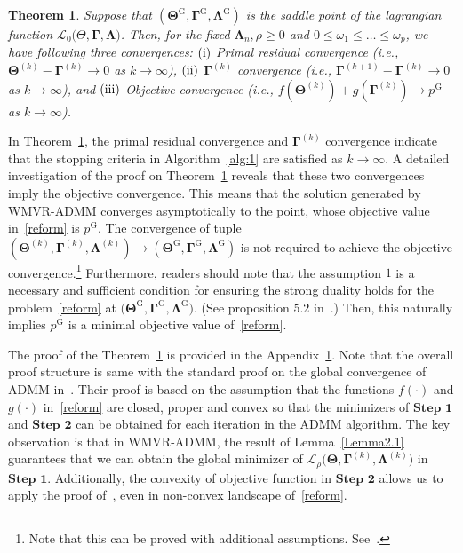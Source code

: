 \documentclass[12pt]{article}
\newcommand{\RN}[1]{%
  \textup{\uppercase\expandafter{\romannumeral#1}}%
}
\newtheorem{theorem}{Theorem}[section]
\begin{document}
\begin{theorem} \label{Thm1}
    Suppose that $(\boldsymbol{\Theta}^{\text{G}},\boldsymbol{\Gamma}^{\text{G}},\boldsymbol{\Lambda}^{\text{G}})$ is the saddle point of the lagrangian function $\mathcal{L}_{0} \big( \Theta,\boldsymbol{\Gamma},\boldsymbol{\Lambda} \big)$.
    Then, for the fixed $\boldsymbol{\Lambda}_{n}, \rho \geq 0 $ and $0\leq \omega_{1} \leq \dots \leq \omega_{p}$, 
    we have following three convergences: 
    $(\RN{1})$ Primal residual convergence (i.e., $\boldsymbol{\Theta}^{(k)}-\boldsymbol{\Gamma}^{(k)}\rightarrow{0}$ as $k\rightarrow{\infty}$), 
    $(\RN{2})$ $\boldsymbol{\Gamma}^{(k)}$ convergence (i.e., $\boldsymbol{\Gamma}^{(k+1)}-\boldsymbol{\Gamma}^{(k)}\rightarrow{0}$ as $k\rightarrow{\infty}$), and
    $(\RN{3})$ Objective convergence (i.e.,  $f(\boldsymbol{\Theta}^{(k)})+g(\boldsymbol{\Gamma}^{(k)})\rightarrow{p^{\text{G}}}$ as $k\rightarrow{\infty}$).
\end{theorem}

In Theorem~\ref{Thm1}, the primal residual convergence and $\boldsymbol{\Gamma}^{(k)}$ convergence indicate that the stopping criteria in Algorithm~\ref{alg:1} are satisfied as $k\rightarrow{\infty}$.
A detailed investigation of the proof on Theorem~\ref{Thm1} reveals that these two convergences imply the objective convergence.
This means that the solution generated by WMVR-ADMM converges asymptotically to the point, whose objective value in~\eqref{reform} is $p^{\text{G}}$.
The convergence of tuple $(\boldsymbol{\Theta}^{(k)},\boldsymbol{\Gamma}^{(k)},\boldsymbol{\Lambda}^{(k)})\rightarrow{(\boldsymbol{\Theta}^{\text{G}},\boldsymbol{\Gamma}^{\text{G}},\boldsymbol{\Lambda}^{\text{G}})}$ is not required to achieve the objective convergence.\footnote{Note that this can be proved with additional assumptions. See~\citet{boyd2011distributed}.}
Furthermore, readers should note that the assumption $1$ is a necessary and sufficient condition for ensuring the strong duality holds for the problem~\eqref{reform} at $\big( \boldsymbol{\Theta}^{\text{G}},\boldsymbol{\Gamma}^{\text{G}},\boldsymbol{\Lambda}^{\text{G}} \big)$.
(See proposition $5.2$ in~\citet{rockafellar1993lagrange}.)
Then, this naturally implies $p^{\text{G}}$ is a minimal objective value of~\eqref{reform}.

The proof of the Theorem~\ref{Thm1} is provided in the Appendix~\ref{Thm1}.
Note that the overall proof structure is same with the standard proof on the global convergence of ADMM in~\citet{boyd2011distributed}.
Their proof is based on the assumption that the functions $f(\cdot)$ and $g(\cdot)$ in~\eqref{reform} are closed, proper and  convex so that the minimizers of $\textbf{Step 1}$ and $\textbf{Step 2}$ can be obtained for each iteration in the ADMM 
algorithm.
The key observation is that in WMVR-ADMM, the result of Lemma~\ref{Lemma2.1} guarantees that we can obtain the global minimizer of $\mathcal{L}_{\rho} \big( \boldsymbol{\Theta},\boldsymbol{\Gamma}^{(k)},\boldsymbol{\Lambda}^{(k)} \big)$ in $\textbf{Step 1}$.
Additionally, the convexity of objective function in $\textbf{Step 2}$ allows us to apply the proof of~\citet{boyd2011distributed}, even in non-convex landscape of~\eqref{reform}.
\end{document}
